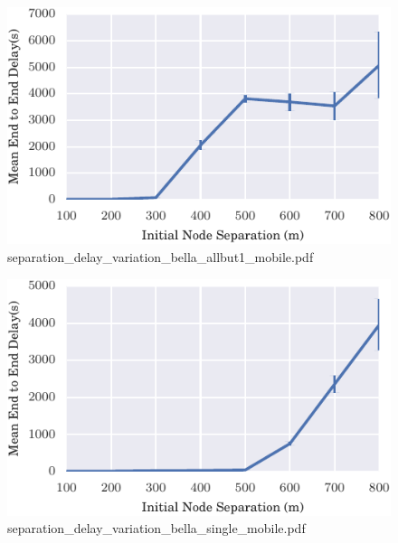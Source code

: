 \documentclass{article}
\begin{document}
\begin{figure}[h!]
\centering
\includegraphics[width=\linewidth]{separation_delay_variation_bella_allbut1_mobile.pdf}
\caption{separation\_delay\_variation\_bella\_allbut1\_mobile.pdf}
\end{figure}




\begin{figure}[h!]
\centering
\includegraphics[width=\linewidth]{separation_delay_variation_bella_single_mobile.pdf}
\caption{separation\_delay\_variation\_bella\_single\_mobile.pdf}
\end{figure}
\end{document}
